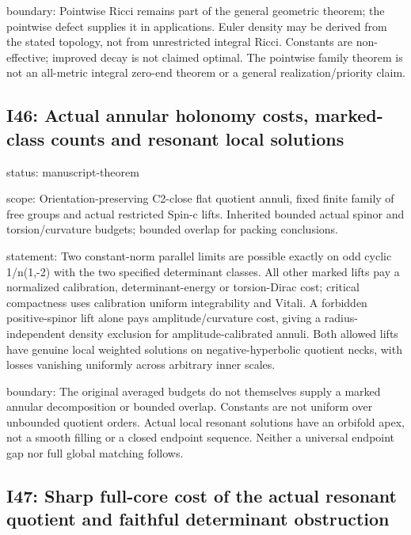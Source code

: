 \documentclass[
  10pt,
]{article}
\begin{document}
boundary: Pointwise Ricci remains part of the general geometric theorem;
the pointwise defect supplies it in applications. Euler density may be
derived from the stated topology, not from unrestricted integral Ricci.
Constants are non-effective; improved decay is not claimed optimal. The
pointwise family theorem is not an all-metric integral zero-end theorem
or a general realization/priority claim.

\hypertarget{i46-actual-annular-holonomy-costs-marked-class-counts-and-resonant-local-solutions}{%
\subsection{I46: Actual annular holonomy costs, marked-class counts and
resonant local
solutions}\label{i46-actual-annular-holonomy-costs-marked-class-counts-and-resonant-local-solutions}}

status: manuscript-theorem

scope: Orientation-preserving C2-close flat quotient annuli, fixed
finite family of free groups and actual restricted Spin-c lifts.
Inherited bounded actual spinor and torsion/curvature budgets; bounded
overlap for packing conclusions.

statement: Two constant-norm parallel limits are possible exactly on odd
cyclic 1/n(1,-2) with the two specified determinant classes. All other
marked lifts pay a normalized calibration, determinant-energy or
torsion-Dirac cost; critical compactness uses calibration uniform
integrability and Vitali. A forbidden positive-spinor lift alone pays
amplitude/curvature cost, giving a radius-independent density exclusion
for amplitude-calibrated annuli. Both allowed lifts have genuine local
weighted solutions on negative-hyperbolic quotient necks, with losses
vanishing uniformly across arbitrary inner scales.

boundary: The original averaged budgets do not themselves supply a
marked annular decomposition or bounded overlap. Constants are not
uniform over unbounded quotient orders. Actual local resonant solutions
have an orbifold apex, not a smooth filling or a closed endpoint
sequence. Neither a universal endpoint gap nor full global matching
follows.

\hypertarget{i47-sharp-full-core-cost-of-the-actual-resonant-quotient-and-faithful-determinant-obstruction}{%
\subsection{I47: Sharp full-core cost of the actual resonant quotient
and faithful determinant
obstruction}\label{i47-sharp-full-core-cost-of-the-actual-resonant-quotient-and-faithful-determinant-obstruction}}
\end{document}
